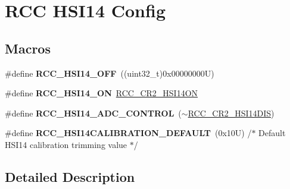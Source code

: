 \hypertarget{group___r_c_c___h_s_i14___config}{}\section{R\+CC H\+S\+I14 Config}
\label{group___r_c_c___h_s_i14___config}
\subsection*{Macros}
\begin{DoxyCompactItemize}
\item 
\mbox{\label{group___r_c_c___h_s_i14___config_gac3435bf798649ee4a037d56a2fda2526}} 
\#define {\bfseries R\+C\+C\+\_\+\+H\+S\+I14\+\_\+\+O\+FF}~((uint32\+\_\+t)0x00000000\+U)
\item 
\mbox{\label{group___r_c_c___h_s_i14___config_ga7b65adb4985783edb7ce30a3fa049992}} 
\#define {\bfseries R\+C\+C\+\_\+\+H\+S\+I14\+\_\+\+ON}~\hyperlink{group___peripheral___registers___bits___definition_gaf600a82eec2d1445e91af6f98baf042e}{R\+C\+C\+\_\+\+C\+R2\+\_\+\+H\+S\+I14\+ON}
\item 
\mbox{\label{group___r_c_c___h_s_i14___config_gaa6ea417e40326fe5b3e1ae207f875a92}} 
\#define {\bfseries R\+C\+C\+\_\+\+H\+S\+I14\+\_\+\+A\+D\+C\+\_\+\+C\+O\+N\+T\+R\+OL}~($\sim$\hyperlink{group___peripheral___registers___bits___definition_gaa9533da17718a4111cd8e1108b41d3a4}{R\+C\+C\+\_\+\+C\+R2\+\_\+\+H\+S\+I14\+D\+IS})
\item 
\mbox{\label{group___r_c_c___h_s_i14___config_gabd2ce21687b0527ab5d3fc18aac1d48a}} 
\#define {\bfseries R\+C\+C\+\_\+\+H\+S\+I14\+C\+A\+L\+I\+B\+R\+A\+T\+I\+O\+N\+\_\+\+D\+E\+F\+A\+U\+LT}~(0x10\+U)   /$\ast$ Default H\+S\+I14 calibration trimming value $\ast$/
\end{DoxyCompactItemize}


\subsection{Detailed Description}
